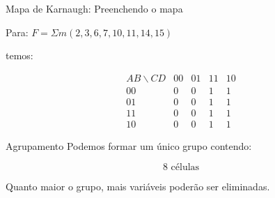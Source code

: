 \begin{frame}{Mapa de Karnaugh: Preenchendo o mapa}
    \small

    Para: $F=\Sigma m(2,3,6,7,10,11,14,15)$

    temos:

    \[
    \begin{array}{c|cccc}
        AB\backslash CD
        & 00 & 01 & 11 & 10 \\ \hline

        00 & 0 & 0 & \boxed{1} & \boxed{1} \\
        01 & 0 & 0 & \boxed{1} & \boxed{1} \\
        11 & 0 & 0 & \boxed{1} & \boxed{1} \\
        10 & 0 & 0 & \boxed{1} & \boxed{1}
    \end{array}
    \]

    \begin{block}{Agrupamento}
        Podemos formar um único grupo contendo:

        \[
            \boxed{8\text{ células}}
        \]

        Quanto maior o grupo, mais variáveis poderão
        ser eliminadas.
    \end{block}

\end{frame}
